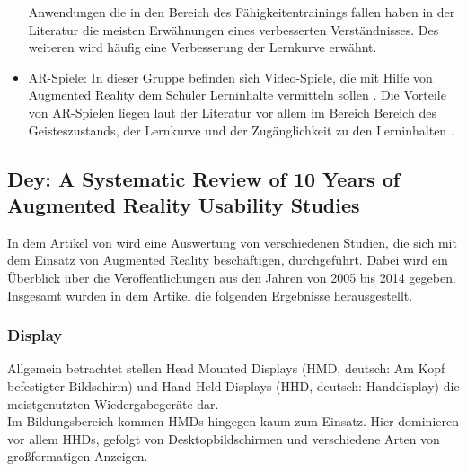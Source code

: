 \begin{itemize}
Anwendungen die in den Bereich des Fähigkeitentrainings fallen haben in der Literatur die meisten Erwähnungen eines verbesserten Verständnisses. Des weiteren wird häufig eine Verbesserung der Lernkurve erwähnt. \citep[Kapitel 5]{diegmann:benefits-ar}
\item AR-Spiele: In dieser Gruppe befinden sich Video-Spiele, die mit Hilfe von Augmented Reality dem Schüler Lerninhalte vermitteln sollen \citep[Kapitel 2.2]{diegmann:benefits-ar}.
Die Vorteile von AR-Spielen liegen laut der Literatur vor allem im Bereich Bereich des Geisteszustands, der Lernkurve und der Zugänglichkeit zu den Lerninhalten \citep[Kapitel 5]{diegmann:benefits-ar}.
\end{itemize}

\subsection{Dey: A Systematic Review of 10 Years of Augmented Reality Usability Studies}
In dem Artikel \citep{dey:review-of-ar-studies} von \citeauthor{dey:review-of-ar-studies} wird eine Auswertung von verschiedenen Studien, die sich mit dem Einsatz von Augmented Reality beschäftigen, durchgeführt. Dabei wird ein Überblick über die Veröffentlichungen aus den Jahren von 2005 bis 2014 gegeben.\\
Insgesamt wurden in dem Artikel die folgenden Ergebnisse herausgestellt.

\subsubsection{Display}
Allgemein betrachtet stellen Head Mounted Displays (HMD, deutsch: \glqq Am Kopf befestigter Bildschirm\grqq ) und Hand-Held Displays (HHD, deutsch: \glqq Handdisplay\grqq ) die meistgenutzten Wiedergabegeräte dar.\\
Im Bildungsbereich kommen HMDs hingegen kaum zum Einsatz. Hier dominieren vor allem HHDs, gefolgt von Desktopbildschirmen und  verschiedene Arten von großformatigen Anzeigen. \citep[Kapitel 3.7]{dey:review-of-ar-studies}

